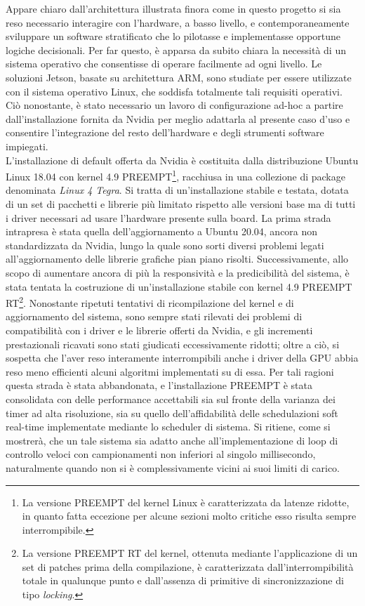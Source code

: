 \indent Appare chiaro dall'architettura illustrata finora come in questo progetto si sia reso necessario interagire con l'hardware, a basso livello, e contemporaneamente sviluppare un software stratificato che lo pilotasse e implementasse opportune logiche decisionali. Per far questo, è apparsa da subito chiara la necessità di un sistema operativo che consentisse di operare facilmente ad ogni livello. Le soluzioni Jetson, basate su architettura ARM, sono studiate per essere utilizzate con il sistema operativo Linux, che soddisfa totalmente tali requisiti operativi. Ciò nonostante, è stato necessario un lavoro di configurazione ad-hoc a partire dall'installazione fornita da Nvidia per meglio adattarla al presente caso d'uso e consentire l'integrazione del resto dell'hardware e degli strumenti software impiegati.\\
L'installazione di default offerta da Nvidia è costituita dalla distribuzione Ubuntu Linux 18.04 con kernel 4.9 PREEMPT\footnote{La versione PREEMPT del kernel Linux è caratterizzata da latenze ridotte, in quanto fatta eccezione per alcune sezioni molto critiche esso risulta sempre interrompibile.}, racchiusa in una collezione di package denominata \emph{Linux 4 Tegra}. Si tratta di un'installazione stabile e testata, dotata di un set di pacchetti e librerie più limitato rispetto alle versioni base ma di tutti i driver necessari ad usare l'hardware presente sulla board. La prima strada intrapresa è stata quella dell'aggiornamento a Ubuntu 20.04, ancora non standardizzata da Nvidia, lungo la quale sono sorti diversi problemi legati all'aggiornamento delle librerie grafiche pian piano risolti. Successivamente, allo scopo di aumentare ancora di più la responsività e la predicibilità del sistema, è stata tentata la costruzione di un'installazione stabile con kernel 4.9 PREEMPT RT\footnote{La versione PREEMPT RT del kernel, ottenuta mediante l'applicazione di un set di patches prima della compilazione, è caratterizzata dall'interrompibilità totale in qualunque punto e dall'assenza di primitive di sincronizzazione di tipo \emph{locking}.}. Nonostante ripetuti tentativi di ricompilazione del kernel e di aggiornamento del sistema, sono sempre stati rilevati dei problemi di compatibilità con i driver e le librerie offerti da Nvidia, e gli incrementi prestazionali ricavati sono stati giudicati eccessivamente ridotti; oltre a ciò, si sospetta che l'aver reso interamente interrompibili anche i driver della GPU abbia reso meno efficienti alcuni algoritmi implementati su di essa. Per tali ragioni questa strada è stata abbandonata, e l'installazione PREEMPT è stata consolidata con delle performance accettabili sia sul fronte della varianza dei timer ad alta risoluzione, sia su quello dell'affidabilità delle schedulazioni soft real-time implementate mediante lo scheduler di sistema. Si ritiene, come si mostrerà, che un tale sistema sia adatto anche all'implementazione di loop di controllo veloci con campionamenti non inferiori al singolo millisecondo, naturalmente quando non si è complessivamente vicini ai suoi limiti di carico.\\

